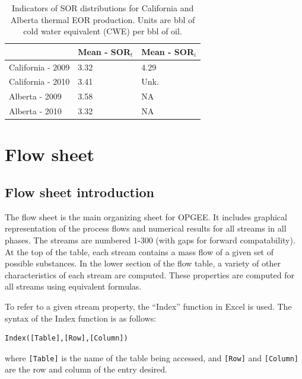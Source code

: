 \documentclass[11pt]{report}
\begin{document}
\begin{table}
\caption{Indicators of SOR distributions for California and Alberta thermal EOR production. Units are bbl of cold water equivalent (CWE) per bbl of oil.}
\label{tab:SOR_stats}
\begin{scriptsize}
\begin{tabularx}{1\columnwidth}{p{}p{}p{}}
\toprule
& Mean - SOR$_t$ & Mean - SOR$_i$ \\
\midrule
California - 2009 & 3.32 & 4.29 \\
California - 2010 & 3.41 & Unk. \\
Alberta - 2009 & 3.58 & NA \\
Alberta - 2010 & 3.32 & NA \\
\bottomrule
\end{tabularx}
\end{scriptsize}
\end{table}





\chapter{Flow sheet}


\clearpage

\section{Flow sheet introduction}\label{sec:gas_balance}

The flow sheet is the main organizing sheet for OPGEE. It includes graphical representation of the process flows and numerical results for all streams in all phases. The streams are numbered 1-300 (with gaps for forward compatability). At the top of the table, each stream contains a mass flow of a given set of possible substances.  In the lower section of the flow table, a variety of other characteristics of each stream are computed. These properties are computed for all streams using equivalent formulas.

To refer to a given stream property, the ``Index'' function in Excel is used. The syntax of the Index function is as follows:
\begin{verbatim}
Index([Table],[Row],[Column])
\end{verbatim}
where \verb+[Table]+ is the name of the table being accessed, and \verb+[Row]+ and \verb+[Column]+ are the row and column of the entry desired.
\end{document}
